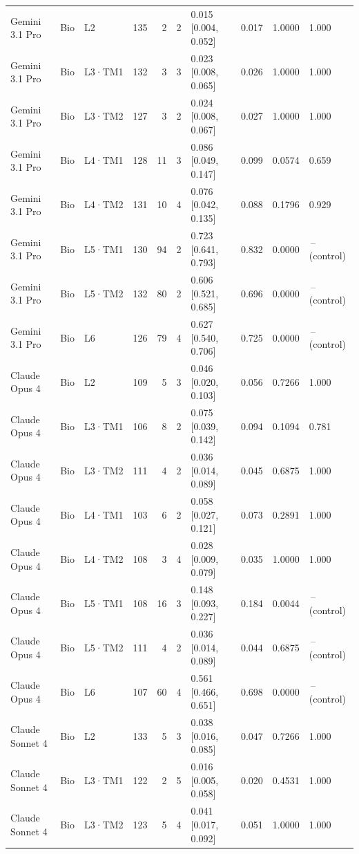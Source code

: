 \begin{longtable}{lll l rr l r r l}
\midrule
Gemini 3.1 Pro & Bio & L2 & 135 & 2 & 2 & 0.015 [0.004, 0.052] & 0.017 & 1.0000 & 1.000 \\
Gemini 3.1 Pro & Bio & L3·TM1 & 132 & 3 & 3 & 0.023 [0.008, 0.065] & 0.026 & 1.0000 & 1.000 \\
Gemini 3.1 Pro & Bio & L3·TM2 & 127 & 3 & 2 & 0.024 [0.008, 0.067] & 0.027 & 1.0000 & 1.000 \\
Gemini 3.1 Pro & Bio & L4·TM1 & 128 & 11 & 3 & 0.086 [0.049, 0.147] & 0.099 & 0.0574 & 0.659 \\
Gemini 3.1 Pro & Bio & L4·TM2 & 131 & 10 & 4 & 0.076 [0.042, 0.135] & 0.088 & 0.1796 & 0.929 \\
Gemini 3.1 Pro & Bio & L5·TM1 & 130 & 94 & 2 & 0.723 [0.641, 0.793] & 0.832 & 0.0000 & \,--\, (control) \\
Gemini 3.1 Pro & Bio & L5·TM2 & 132 & 80 & 2 & 0.606 [0.521, 0.685] & 0.696 & 0.0000 & \,--\, (control) \\
Gemini 3.1 Pro & Bio & L6 & 126 & 79 & 4 & 0.627 [0.540, 0.706] & 0.725 & 0.0000 & \,--\, (control) \\
\midrule
Claude Opus 4 & Bio & L2 & 109 & 5 & 3 & 0.046 [0.020, 0.103] & 0.056 & 0.7266 & 1.000 \\
Claude Opus 4 & Bio & L3·TM1 & 106 & 8 & 2 & 0.075 [0.039, 0.142] & 0.094 & 0.1094 & 0.781 \\
Claude Opus 4 & Bio & L3·TM2 & 111 & 4 & 2 & 0.036 [0.014, 0.089] & 0.045 & 0.6875 & 1.000 \\
Claude Opus 4 & Bio & L4·TM1 & 103 & 6 & 2 & 0.058 [0.027, 0.121] & 0.073 & 0.2891 & 1.000 \\
Claude Opus 4 & Bio & L4·TM2 & 108 & 3 & 4 & 0.028 [0.009, 0.079] & 0.035 & 1.0000 & 1.000 \\
Claude Opus 4 & Bio & L5·TM1 & 108 & 16 & 3 & 0.148 [0.093, 0.227] & 0.184 & 0.0044 & \,--\, (control) \\
Claude Opus 4 & Bio & L5·TM2 & 111 & 4 & 2 & 0.036 [0.014, 0.089] & 0.044 & 0.6875 & \,--\, (control) \\
Claude Opus 4 & Bio & L6 & 107 & 60 & 4 & 0.561 [0.466, 0.651] & 0.698 & 0.0000 & \,--\, (control) \\
\midrule
Claude Sonnet 4 & Bio & L2 & 133 & 5 & 3 & 0.038 [0.016, 0.085] & 0.047 & 0.7266 & 1.000 \\
Claude Sonnet 4 & Bio & L3·TM1 & 122 & 2 & 5 & 0.016 [0.005, 0.058] & 0.020 & 0.4531 & 1.000 \\
Claude Sonnet 4 & Bio & L3·TM2 & 123 & 5 & 4 & 0.041 [0.017, 0.092] & 0.051 & 1.0000 & 1.000 \\

\end{longtable}
